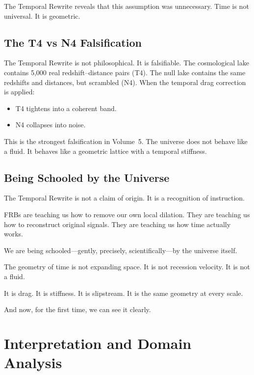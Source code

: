 \documentclass[11pt, letterpaper, openany]{book}
\begin{document}
The Temporal Rewrite reveals that this assumption was unnecessary.  
Time is not universal.  
It is geometric.

\section*{The T4 vs N4 Falsification}
The Temporal Rewrite is not philosophical. It is falsifiable. The cosmological lake contains 5,000
real redshift–distance pairs (T4). The null lake contains the same redshifts and distances, but
scrambled (N4). When the temporal drag correction is applied:

\begin{itemize}
    \item T4 tightens into a coherent band.
    \item N4 collapses into noise.
\end{itemize}

This is the strongest falsification in Volume~5.  
The universe does not behave like a fluid.  
It behaves like a geometric lattice with a temporal stiffness.

\section*{Being Schooled by the Universe}
The Temporal Rewrite is not a claim of origin.  
It is a recognition of instruction.

FRBs are teaching us how to remove our own local dilation.  
They are teaching us how to reconstruct original signals.  
They are teaching us how time actually works.

We are being schooled—gently, precisely, scientifically—by the universe itself.

The geometry of time is not expanding space.  
It is not recession velocity.  
It is not a fluid.

It is drag.  
It is stiffness.  
It is slipstream.  
It is the same geometry at every scale.

And now, for the first time, we can see it clearly.

\chapter{Interpretation and Domain Analysis}
\end{document}

